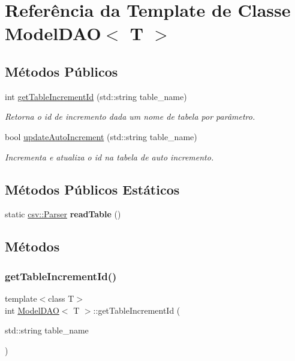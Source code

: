 \hypertarget{classModelDAO}{}\section{Referência da Template de Classe Model\+D\+AO$<$ T $>$}
\label{classModelDAO}
\subsection*{Métodos Públicos}
\begin{DoxyCompactItemize}
\item 
int \hyperlink{classModelDAO_a24cf7f88d833dba6424271767403cbda}{get\+Table\+Increment\+Id} (std\+::string table\+\_\+name)
\begin{DoxyCompactList}\small\item\em Retorna o id de incremento dada um nome de tabela por parâmetro. \end{DoxyCompactList}\item 
bool \hyperlink{classModelDAO_af524ba9765af94ca633587d3ecf8964b}{update\+Auto\+Increment} (std\+::string table\+\_\+name)
\begin{DoxyCompactList}\small\item\em Incrementa e atualiza o id na tabela de auto incremento. \end{DoxyCompactList}\end{DoxyCompactItemize}
\subsection*{Métodos Públicos Estáticos}
\begin{DoxyCompactItemize}
\item 
\mbox{\label{classModelDAO_ad34aa526be65334b13793a79f3f6fea9}} 
static \hyperlink{classcsv_1_1Parser}{csv\+::\+Parser} {\bfseries read\+Table} ()
\end{DoxyCompactItemize}


\subsection{Métodos}
\mbox{\label{classModelDAO_a24cf7f88d833dba6424271767403cbda}} 
\subsubsection{\texorpdfstring{get\+Table\+Increment\+Id()}{getTableIncrementId()}}
{\footnotesize\ttfamily template$<$class T$>$ \\
int \hyperlink{classModelDAO}{Model\+D\+AO}$<$ T $>$\+::get\+Table\+Increment\+Id (\begin{DoxyParamCaption}\item[{std\+::string}]{table\+\_\+name }\end{DoxyParamCaption})\hspace{0.3cm}{\ttfamily [inline]}}



